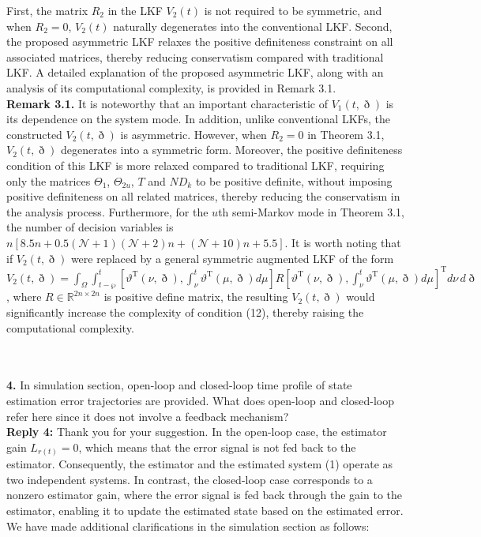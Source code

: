 \documentclass[14pt,fleqn]{article}
\begin{document}
First, the matrix $R_2$ in the LKF $V_2(t)$ is not required to be symmetric, and when $R_2=0$, $V_2(t)$ naturally degenerates into the conventional LKF. Second, the proposed asymmetric LKF relaxes the positive definiteness constraint on all associated matrices, thereby reducing conservatism compared with traditional LKF. A detailed explanation of the proposed asymmetric LKF, along with an analysis of its computational complexity, is provided in Remark 3.1.\\

\textbf{Remark 3.1.} It is noteworthy that an important characteristic of $V_1(t, \eth)$ is its dependence on the system mode. In addition, unlike conventional LKFs, the constructed $V_2(t, \eth)$ is asymmetric. However, when $R_2 = 0$ in Theorem 3.1, $V_2(t, \eth)$ degenerates into a symmetric form. Moreover, the positive definiteness condition of this LKF is more relaxed compared to traditional LKF, requiring only the matrices $\Theta_{1}$, $\Theta_{2u}$, $T$ and $N D_k$ to be positive definite, without imposing positive definiteness on all related matrices, thereby reducing the conservatism in the analysis process. {\color{red} Furthermore, for the $u$th semi-Markov mode in Theorem 3.1, the number of decision variables is $n[8.5n+0.5(\mathcal{N}+1)( \mathcal{N}+2)n+(\mathcal{N}+10)n+5.5]$. It is worth noting that if $V_2(t, \eth)$ were replaced by a general symmetric augmented LKF of the form $V_2(t, \eth) = \int_\Omega \int_{t-\wp}^t \left[\vartheta^\text{T}(\nu, \eth), \int_\nu^t \vartheta^\text{T}(\mu, \eth) d\mu \right] R \left[ \vartheta^\text{T}(\nu, \eth), \int_\nu^t \vartheta^\text{T}(\mu, \eth) d\mu \right]^\text{T} d\nu \, d\eth$, where $R \in \mathbb{R}^{2n \times 2n}$ is positive define matrix, the resulting $V_2(t, \eth)$ would significantly increase the complexity of condition (12), thereby raising the computational complexity.}


~\\
\\
\textbf{4.} In simulation section, open-loop and closed-loop time profile of state estimation error trajectories are provided. What does open-loop and closed-loop refer here since it does not involve a feedback mechanism?\\

\indent \textbf{Reply 4:} Thank you for your suggestion. In the open-loop case, the estimator gain $L_{r(t)}=0$, which means that the error signal is not fed back to the estimator. Consequently, the estimator and the estimated system (1) operate as two independent systems. In contrast, the closed-loop case corresponds to a nonzero estimator gain, where the error signal is fed back through the gain to the estimator, enabling it to update the estimated state based on the estimated error. We have made additional clarifications in the simulation section as follows:\\
\end{document}
